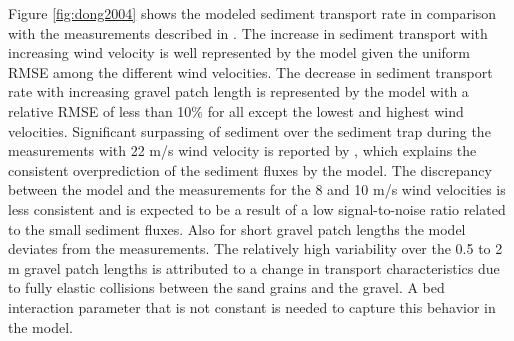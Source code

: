 Figure \ref{fig:dong2004} shows the modeled sediment transport rate in
comparison with the measurements described in \citet{Dong2004b}. The
increase in sediment transport with increasing wind velocity is well
represented by the model given the uniform RMSE among the different
wind velocities. The decrease in sediment transport rate with
increasing gravel patch length is represented by the model with a
relative RMSE of less than 10\% for all except the lowest and highest
wind velocities. Significant surpassing of sediment over the sediment
trap during the measurements with 22 m/s wind velocity is reported by
\citet{Dong2004b}, which explains the consistent overprediction of the
sediment fluxes by the model. The discrepancy between the model and
the measurements for the 8 and 10 m/s wind velocities is less
consistent and is expected to be a result of a low signal-to-noise
ratio related to the small sediment fluxes. Also for short gravel
patch lengths the model deviates from the measurements. The relatively
high variability over the 0.5 to 2 m gravel patch lengths is
attributed to a change in transport characteristics \citep{Dong2004b}
due to fully elastic collisions between the sand grains and the
gravel. A bed interaction parameter that is not constant is needed to
capture this behavior in the model.


